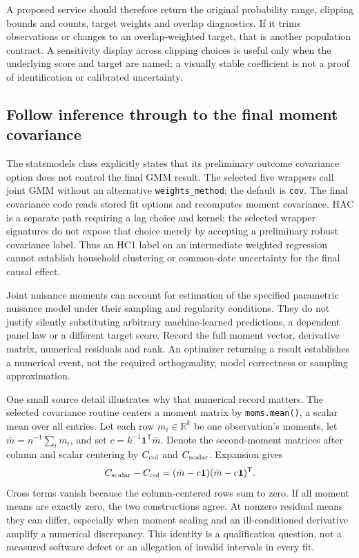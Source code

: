 A proposed service should therefore return the original probability range,
clipping bounds and counts, target weights and overlap diagnostics. If it
trims observations or changes to an overlap-weighted target, that is another
population contract. A sensitivity display across clipping choices is useful
only when the underlying score and target are named; a visually stable
coefficient is not a proof of identification or calibrated uncertainty.

\subsection{Follow inference through to the final moment covariance}
\label{exec20:pyfx-covariance}
The statsmodels class explicitly states that its preliminary outcome
covariance option does not control the final GMM result. The selected five
wrappers call joint GMM without an alternative \texttt{weights\_method};
the default is \texttt{cov}. The final covariance code reads stored fit
options and recomputes moment covariance. HAC is a separate path requiring
a lag choice and kernel; the selected wrapper signatures do not expose that
choice merely by accepting a preliminary robust covariance label.
Thus an HC1 label on an intermediate weighted regression cannot establish
household clustering or common-date uncertainty for the final causal effect.
\citep{exec20_python_effect_source,v131_sw_statsmodels}

Joint nuisance moments can account for estimation of the specified
parametric nuisance model under their sampling and regularity conditions.
They do not justify silently substituting arbitrary machine-learned
predictions, a dependent panel law or a different target score. Record the
full moment vector, derivative matrix, numerical residuals and rank. An
optimizer returning a result establishes a numerical event, not the required
orthogonality, model correctness or sampling approximation.

One small source detail illustrates why that numerical record matters.
The selected covariance routine centers a moment matrix by
\texttt{moms.mean()}, a scalar mean over all entries. Let each row
$m_i\in\mathbb R^k$ be one observation's moments, let
$\bar m=n^{-1}\sum_i m_i$, and set $c=k^{-1}\mathbf1^{\mathsf T}\bar m$.
Denote the second-moment matrices after column and scalar centering by
$C_{\rm col}$ and $C_{\rm scalar}$. Expansion gives
\begin{equation}
 C_{\rm scalar}-C_{\rm col}
   =(\bar m-c\mathbf1)(\bar m-c\mathbf1)^{\mathsf T}.
 \label{exec20:pyfx-centering}
\end{equation}
Cross terms vanish because the column-centered rows sum to zero.
If all moment means are exactly zero, the two constructions agree.
At nonzero residual means they can differ, especially when moment scaling
and an ill-conditioned derivative amplify a numerical discrepancy.
This identity is a qualification question, not a measured software defect
or an allegation of invalid intervals in every fit.
\citep{exec20_python_effect_source}

